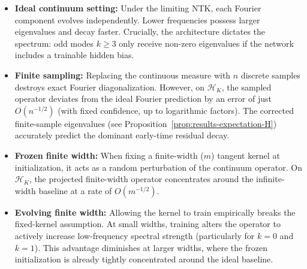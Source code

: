 \begin{itemize}
	\item \textbf{Ideal continuum setting:} Under the limiting NTK, each
	      Fourier component evolves independently. Lower frequencies possess larger
	      eigenvalues and decay faster. Crucially, the architecture dictates the
	      spectrum: odd modes $k \ge 3$ only receive non-zero eigenvalues if the
	      network includes a trainable hidden bias.

	\item \textbf{Finite sampling:} Replacing the continuous measure with $n$
	      discrete samples destroys exact Fourier diagonalization. However, on
	      $\mathcal{H}_K$, the sampled operator deviates from the ideal Fourier
	      prediction by an error of just $O(n^{-1/2})$ (with fixed confidence, up to
	      logarithmic factors). The corrected finite-sample eigenvalues (see
	      Proposition~\ref{prop:results-expectation-H}) accurately predict the dominant
	      early-time residual decay.

	\item \textbf{Frozen finite width:} When fixing a finite-width ($m$)
	      tangent kernel at initialization, it acts as a random perturbation of the
	      continuum operator. On $\mathcal{H}_K$, the projected finite-width operator
	      concentrates around the infinite-width baseline at a rate of $O(m^{-1/2})$.

	\item \textbf{Evolving finite width:} Allowing the kernel to train
	      empirically breaks the fixed-kernel assumption. At small widths, training
	      alters the operator to actively increase low-frequency spectral strength
	      (particularly for $k=0$ and $k=1$). This advantage diminishes at larger
	      widths, where the frozen initialization is already tightly concentrated
	      around the ideal baseline.
\end{itemize}
